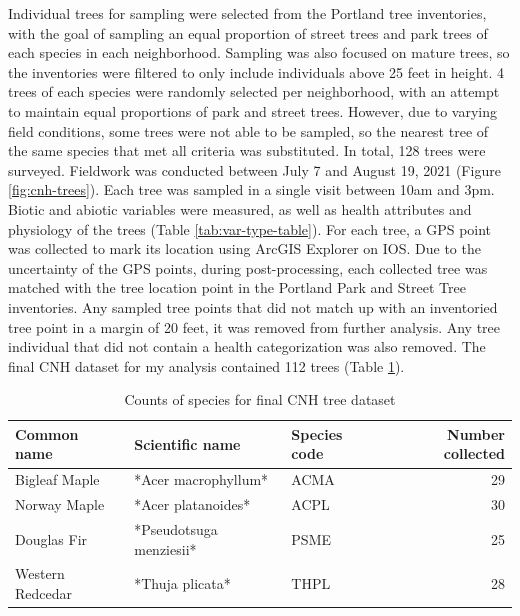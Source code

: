 \documentclass[12pt,twoside]{reedthesis}
\begin{document}
Individual trees for sampling were selected from the Portland tree
inventories, with the goal of sampling an equal proportion of street
trees and park trees of each species in each neighborhood. Sampling was
also focused on mature trees, so the inventories were filtered to only
include individuals above 25 feet in height. 4 trees of each species
were randomly selected per neighborhood, with an attempt to maintain
equal proportions of park and street trees. However, due to varying
field conditions, some trees were not able to be sampled, so the nearest
tree of the same species that met all criteria was substituted. In
total, 128 trees were surveyed. Fieldwork was conducted between July 7
and August 19, 2021 (Figure \ref{fig:cnh-trees}). Each tree was sampled
in a single visit between 10am and 3pm. Biotic and abiotic variables
were measured, as well as health attributes and physiology of the trees
(Table \ref{tab:var-type-table}). For each tree, a GPS point was
collected to mark its location using ArcGIS Explorer on IOS. Due to the
uncertainty of the GPS points, during post-processing, each collected
tree was matched with the tree location point in the Portland Park and
Street Tree inventories. Any sampled tree points that did not match up
with an inventoried tree point in a margin of 20 feet, it was removed
from further analysis. Any tree individual that did not contain a health
categorization was also removed. The final CNH dataset for my analysis
contained 112 trees (Table \ref{tab:cnh-tree-counts-2}).
\begin{table}

\caption[Final CNH Tree counts]{\label{tab:cnh-tree-counts-2}Counts of species for final CNH tree dataset}
\centering
\begin{tabular}[t]{lllr}
\toprule
Common name & Scientific name & Species code & Number collected\\
\midrule
Bigleaf Maple & *Acer macrophyllum* & ACMA & 29\\
Norway Maple & *Acer platanoides* & ACPL & 30\\
Douglas Fir & *Pseudotsuga menziesii* & PSME & 25\\
Western Redcedar & *Thuja plicata* & THPL & 28\\
\bottomrule
\end{tabular}
\end{table}
\end{document}
